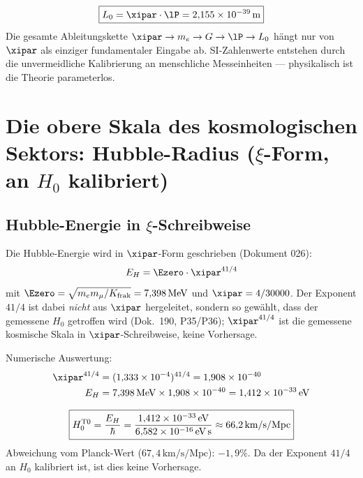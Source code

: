 \begin{keyresult}
\begin{equation}
	\boxed{L_0 = \xipar \cdot \lP = 2{,}155 \times 10^{-39}\,\text{m}}
\end{equation}
Die gesamte Ableitungskette $\xipar \to m_e \to G \to \lP \to L_0$ hängt nur von $\xipar$ als einziger fundamentaler Eingabe ab. SI-Zahlenwerte entstehen durch die unvermeidliche Kalibrierung an menschliche Messeinheiten — physikalisch ist die Theorie parameterlos.
\end{keyresult}

\section{Die obere Skala des kosmologischen Sektors: Hubble-Radius (\texorpdfstring{$\xi$}{xi}-Form, an $H_0$ kalibriert)}

\subsection{Hubble-Energie in \texorpdfstring{$\xi$}{xi}-Schreibweise}

Die Hubble-Energie wird in $\xipar$-Form geschrieben (Dokument 026):
\begin{equation}
	E_H = \Ezero \cdot \xipar^{41/4}
\end{equation}
mit $\Ezero = \sqrt{m_e m_\mu/K_{\text{frak}}} = 7{,}398\,\text{MeV}$ und $\xipar = 4/30000$. Der Exponent $41/4$ ist dabei \emph{nicht} aus $\xipar$ hergeleitet, sondern so gewählt, dass der gemessene $H_0$ getroffen wird (Dok.~190, P35/P36); $\xipar^{41/4}$ ist die gemessene kosmische Skala in $\xipar$-Schreibweise, keine Vorhersage.

Numerische Auswertung:
\begin{align}
	\xipar^{41/4} &= (1{,}333 \times 10^{-4})^{41/4} = 1{,}908 \times 10^{-40} \\
	E_H &= 7{,}398\,\text{MeV} \times 1{,}908 \times 10^{-40} = 1{,}412 \times 10^{-33}\,\text{eV}
\end{align}

\begin{keyresult}
\begin{equation}
	\boxed{H_0^{\text{T0}} = \frac{E_H}{\hbar} = \frac{1{,}412 \times 10^{-33}\,\text{eV}}{6{,}582 \times 10^{-16}\,\text{eV\,s}} \approx 66{,}2\,\text{km/s/Mpc}}
\end{equation}
Abweichung vom Planck-Wert ($67{,}4\,\text{km/s/Mpc}$): $-1{,}9\%$. Da der Exponent $41/4$ an $H_0$ kalibriert ist, ist dies keine Vorhersage.
\end{keyresult}

